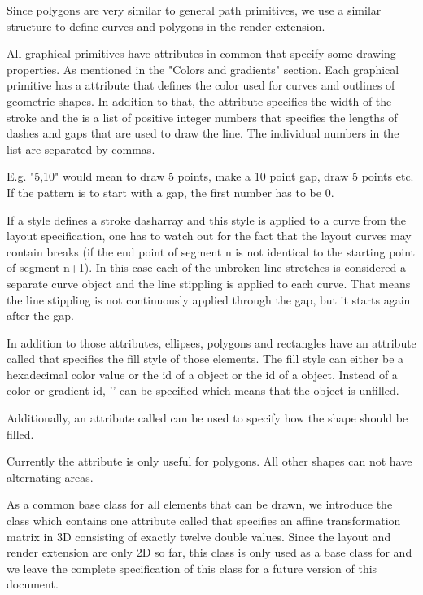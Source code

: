 Since polygons are very similar to general path primitives, we use a similar structure to define curves and
polygons in the render extension.

All graphical primitives have attributes in common that specify some 
drawing properties. As mentioned in the "Colors and gradients" section. 
Each graphical primitive has a  attribute that defines the color used for curves 
and outlines of geometric shapes. In addition to that, the  
attribute specifies the width of the stroke and the  
is a list of positive integer numbers that specifies the lengths of dashes and 
gaps that are used to draw the line. The individual numbers in the list are separated by commas. 

E.g. "5,10" would mean to draw 5 points, make a 10 point gap, draw 5 points etc. If the pattern is to start with a gap, the first number has to be 0. 

If a style defines a stroke dasharray and this style is applied to a curve from the layout specification, one has to watch out for the fact that the layout curves may contain breaks (if the end point of segment n is not identical to the starting point of segment n+1). In this case each of the unbroken line stretches is considered a separate curve object and the line stippling is applied to each curve. That means the line stippling is not continuously applied through the gap, but it starts again after the gap.

In addition to those attributes, ellipses, 
polygons and rectangles have an attribute called  that specifies 
the fill style of those elements. The fill style can either be a hexadecimal
color value or the id of a \ColorDefinition object or the id of a \GradientBase
object. 
Instead of a color or gradient id, '' can be specified
 which means that the object is unfilled.

Additionally, an attribute called  can be used to specify how the shape should be filled. 

Currently the  attribute is only useful for polygons. All other shapes can not have alternating areas.

As a common base class for all elements that can be drawn, we introduce the \Transformation class which contains one attribute called  that specifies an affine transformation matrix in 3D consisting of exactly twelve double values.
Since the layout and render extension are only 2D so far, this class is only used as a base class for \TransformationTwoD and we leave the complete specification of this class for a future version of this document.

